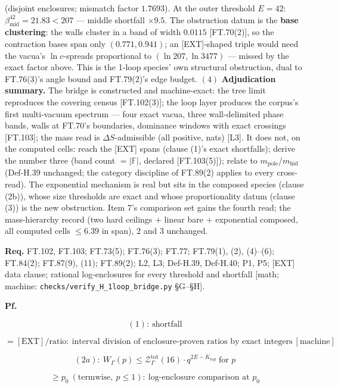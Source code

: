 \begin{theorem}
(disjoint enclosures; mismatch factor $1.7693$). At the outer threshold $E=42$: $\beta_{\mathrm{mid}}^{42}=21.83<207$ — middle shortfall $\times9.5$. The obstruction datum is the \textbf{base clustering}: the walls cluster in a band of width $0.0115$ [FT.70(2)], so the contraction bases span only $(0.771,0.941)$; an [EXT]-shaped triple would need the vacua's $\ln c$-spreads proportional to $(\ln207,\ln3477)$ — missed by the exact factor above. This is the 1-loop species' own structural obstruction, dual to FT.76(3)'s angle bound and FT.79(2)'s edge budget. $(4)$ \textbf{Adjudication summary.} The bridge is constructed and machine-exact: the tree limit reproduces the covering census [FT.102(3)]; the loop layer produces the corpus's first multi-vacuum spectrum — four exact vacua, three wall-delimited phase bands, walls at FT.70's boundaries, dominance windows with exact crossings [FT.103]; the mass read is $\Delta S$-admissible (all positive, nats) [L3]. It does not, on the computed cells: reach the [EXT] spans (clause (1)'s exact shortfalls); derive the number three (band count $=|\mathbb F|$, declared [FT.103(5)]); relate to $m_{\mathrm{pole}}$/$m_{\mathrm{hid}}$ (Def-H.39 unchanged; the category discipline of FT.89(2) applies to every cross-read). The exponential mechanism is real but sits in the composed species (clause (2b)), whose size thresholds are exact and whose proportionality datum (clause (3)) is the new obstruction. Item 7's comparison set gains the fourth read; the mass-hierarchy record (two hard ceilings $+$ linear bare $+$ exponential composed, all computed cells $\le6.39$ in span), 2 and 3 unchanged.

\textbf{Req.} FT.102, FT.103; FT.73(5); FT.76(3); FT.77; FT.79(1), (2), (4)–(6); FT.84(2); FT.87(9), (11); FT.89(2); L2, L3; Def-H.39, Def-H.40; P1, P5; [EXT] data clause; rational log-enclosures for every threshold and shortfall [math; machine: \texttt{checks/\allowbreak{}verify\_\allowbreak{}H\_\allowbreak{}1loop\_\allowbreak{}bridge.py} §G–§H].

\textbf{Pf.}

\[
(1):\ \text{shortfall}
\]

\[
= [\mathrm{EXT}]/\text{ratio}:\ \text{interval division of enclosure-proven ratios by exact integers}\ [\text{machine}]
\]

\[
(2a):\ W_\Gamma(p)\le\mathcal Z^{\mathrm{tot}}_\Gamma(16)\cdot q^{2E-K_{\mathrm{top}}}\ \text{for }p
\]

\[
\ge p_0\ (\text{termwise},\ p\le1):\ \text{log-enclosure comparison at }p_0
\]


\end{theorem}
